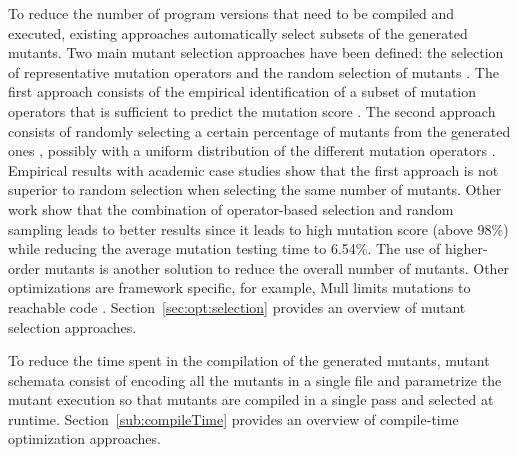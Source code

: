 To reduce the number of program versions that need to be compiled and executed, existing approaches automatically select subsets of the generated mutants. Two main mutant selection approaches have been defined: the selection of representative mutation operators and the random selection of mutants \cite{zhang2010operator}. The first approach consists of the empirical identification of a subset of mutation operators that is sufficient to predict the mutation score \cite{siami2008sufficient,barbosa2001toward}. The second approach consists of randomly selecting a certain percentage of mutants from the generated ones \cite{wong1995reducing}, possibly with a uniform distribution of the different mutation operators \cite{zhang2010operator}. Empirical results with academic case studies \cite{zhang2010operator} show that the first approach is not superior to random selection when selecting the same number of mutants. Other work \cite{zhang2013operator} show that the combination of operator-based selection and random sampling leads to better results since it leads to high mutation score (above 98\%) while reducing the average mutation testing time to 6.54\%. The use of higher-order mutants is another solution to reduce the overall number of mutants. 
Other optimizations are framework specific, for example, Mull limits mutations to reachable code \cite{hariri2018srciror}. Section~\ref{sec:opt:selection} provides an overview of mutant selection approaches.

To reduce the time spent in the compilation of the generated mutants, mutant schemata \cite{untch1993mutation} consist of encoding all the mutants in a single file and parametrize the mutant execution so that mutants are compiled in a single pass and selected at runtime. Section~\ref{sub:compileTime} provides an overview of compile-time optimization approaches.

